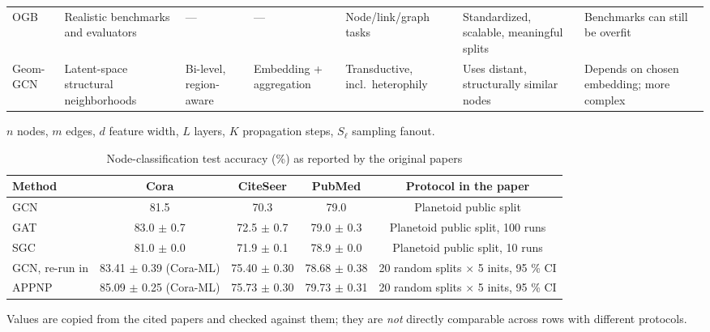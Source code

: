 \documentclass[conference]{IEEEtran}
\begin{document}
\begin{table}[!t]
\begin{tabularx}{\textwidth}{l>{\raggedright\arraybackslash}X>{\raggedright\arraybackslash}X>{\raggedright\arraybackslash}X>{\raggedright\arraybackslash}X>{\raggedright\arraybackslash}X>{\raggedright\arraybackslash}X}
OGB \cite{b9} & Realistic benchmarks and evaluators & --- & --- & Node/link/graph tasks & Standardized, scalable, meaningful splits & Benchmarks can still be overfit \\
Geom-GCN \cite{b10} & Latent-space structural neighborhoods & Bi-level, region-aware & Embedding + aggregation & Transductive, incl.~heterophily & Uses distant, structurally similar nodes & Depends on chosen embedding; more complex \\
\hline
\end{tabularx}
\par\vspace{2pt}\raggedright \(n\) nodes, \(m\) edges, \(d\) feature width, \(L\) layers, \(K\) propagation steps, \(S_\ell\) sampling fanout.
\end{table}

\begin{table}[!t]
\centering
\footnotesize
\renewcommand{\arraystretch}{1.15}
\caption{Node-classification test accuracy (\%) as reported by the original papers}
\label{tab:2}
\begin{tabular}{lcccc}
\hline
\textbf{Method} & \textbf{Cora} & \textbf{CiteSeer} & \textbf{PubMed} & \textbf{Protocol in the paper} \\
\hline
GCN \cite{b1} & 81.5 & 70.3 & 79.0 & Planetoid public split \cite{b12} \\
GAT \cite{b3} & 83.0 \ensuremath{\pm} 0.7 & 72.5 \ensuremath{\pm} 0.7 & 79.0 \ensuremath{\pm} 0.3 & Planetoid public split, 100 runs \\
SGC \cite{b5} & 81.0 \ensuremath{\pm} 0.0 & 71.9 \ensuremath{\pm} 0.1 & 78.9 \ensuremath{\pm} 0.0 & Planetoid public split, 10 runs \\
GCN, re-run in \cite{b6} & 83.41 \ensuremath{\pm} 0.39 (Cora-ML) & 75.40 \ensuremath{\pm} 0.30 & 78.68 \ensuremath{\pm} 0.38 & 20 random splits \ensuremath{\times} 5 inits, 95 \% CI \\
APPNP \cite{b6} & 85.09 \ensuremath{\pm} 0.25 (Cora-ML) & 75.73 \ensuremath{\pm} 0.30 & 79.73 \ensuremath{\pm} 0.31 & 20 random splits \ensuremath{\times} 5 inits, 95 \% CI \\
\hline
\end{tabular}
\par\vspace{2pt}\raggedright Values are copied from the cited papers and checked against them; they are \emph{not} directly comparable across rows with different protocols.
\end{table}
\end{document}

